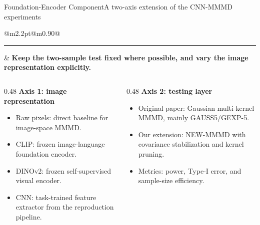 \documentclass[aspectratio=169,10pt]{beamer}
\makeatletter
\newcommand{\pos}[1]{\textcolor{fudanblue}{#1}}
\newcommand{\HL}[1]{\textcolor{accentgreen}{#1}}
\newcommand{\keyline}[1]{%
  \vspace{0.04cm}
  \noindent\begin{tabular}{@{}m{2.2pt}@{\hspace{0.55em}}m{0.90\linewidth}@{}}
    {\color{accentgreen}\rule{2.2pt}{1.35em}} & \textbf{#1}
  \end{tabular}
  \vspace{0.09cm}
}
\makeatother
\begin{document}
\begin{frame}{Foundation-Encoder Component}{A two-axis extension of the CNN-MMMD experiments}
\keyline{Keep the two-sample test fixed where possible, and vary the image representation explicitly.}
\vspace{0.20cm}
\begin{columns}[T,totalwidth=\linewidth]
\begin{column}{0.48\linewidth}
\textbf{\pos{Axis 1: image representation}}
\begin{itemize}
  \item Raw pixels: direct baseline for image-space MMMD.
  \item CLIP: frozen image-language foundation encoder.
  \item DINOv2: frozen self-supervised visual encoder.
  \item CNN: task-trained feature extractor from the reproduction pipeline.
\end{itemize}
\end{column}
\begin{column}{0.48\linewidth}
\textbf{\HL{Axis 2: testing layer}}
\begin{itemize}
  \item Original paper: Gaussian multi-kernel MMMD, mainly GAUSS5/GEXP-5.
  \item Our extension: NEW-MMMD with covariance stabilization and kernel pruning.
  \item Metrics: power, Type-I error, and sample-size efficiency.
\end{itemize}
\end{column}
\end{columns}
\end{frame}
\end{document}
